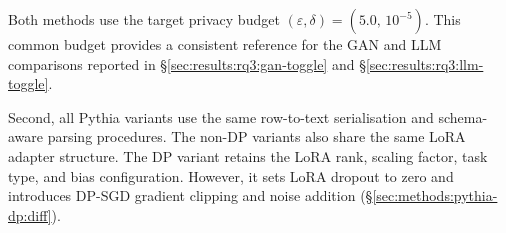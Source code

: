 Both methods use the target privacy budget
$(\varepsilon,\delta)=(5.0,\,10^{-5})$. This common budget provides a
consistent reference for the GAN and LLM comparisons reported in
\S\ref{sec:results:rq3:gan-toggle} and
\S\ref{sec:results:rq3:llm-toggle}.

Second, all Pythia variants use the same row-to-text serialisation and
schema-aware parsing procedures. The non-DP variants also share the same
LoRA adapter structure. The DP variant retains the LoRA rank, scaling
factor, task type, and bias configuration. However, it sets LoRA dropout
to zero and introduces DP-SGD gradient clipping and noise addition
(\S\ref{sec:methods:pythia-dp:diff}).